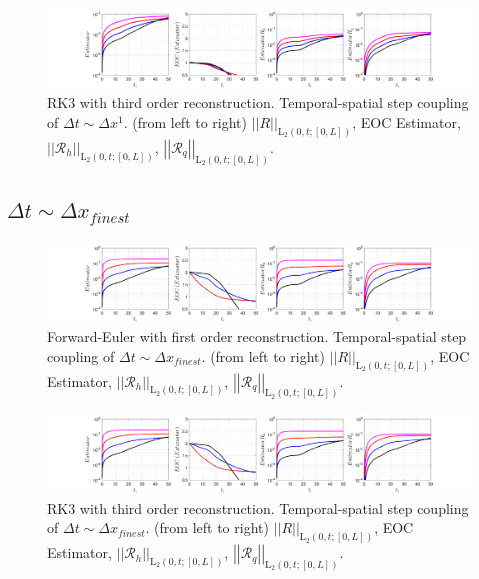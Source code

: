 \documentclass[12pt,a4paper]{article}
\numberwithin{equation}{section}
\theoremstyle{definition}
\newcommand{\leb}{\text{L}}
\newcommand{\qp}[1]{\left(#1\right)}
\newcommand{\qb}[1]{\left[#1\right]}
\newcommand{\Normgs}[1]{\left|\left|#1\right|\right|}
\begin{document}
\begin{figure}[H]
	\hspace{-3cm}
	\includegraphics[scale=0.55]{../figures/fig_SHW_RK3_LXF_rec3_pow_oneplots_1x5_shw_periodic}	
	\caption{RK3 with third order reconstruction.  Temporal-spatial step coupling of $\Delta t\sim \Delta x^1$. (from left to right) $\Normgs{R}_{\leb_2\qp{0,t; \qb{0,L}}}$, EOC Estimator, $\Normgs{\mathcal{R}_h}_{\leb_2\qp{0,t; \qb{0,L}}}$, $\Normgs{\mathcal{R}_q}_{\leb_2\qp{0,t; \qb{0,L}}}$.}
	\label{fig_all_RK3_LXF_rec3_pow_one}
\end{figure}



\subsection*{$\Delta t \sim \Delta x_{finest}$}
\begin{figure}[H]
	\hspace{-3cm}
	\includegraphics[scale=0.55]{../figures/fig_SHW_RK1_LXF_rec1_fixedplots_1x5_shw_periodic}	
	\caption{Forward-Euler with first order reconstruction.  Temporal-spatial step coupling of $\Delta t\sim \Delta x_{finest}$. (from left to right) $\Normgs{R}_{\leb_2\qp{0,t; \qb{0,L}}}$, EOC Estimator, $\Normgs{\mathcal{R}_h}_{\leb_2\qp{0,t; \qb{0,L}}}$, $\Normgs{\mathcal{R}_q}_{\leb_2\qp{0,t; \qb{0,L}}}$.}
	\label{fig_all_RK1_LXF_rec1_fixed}
\end{figure}

\begin{figure}[H]
	\hspace{-3cm}
	\includegraphics[scale=0.55]{../figures/fig_SHW_RK3_LXF_rec3_fixedplots_1x5_shw_periodic}	
	\caption{RK3 with third order reconstruction.  Temporal-spatial step coupling of $\Delta t\sim \Delta x_{finest}$. (from left to right) $\Normgs{R}_{\leb_2\qp{0,t; \qb{0,L}}}$, EOC Estimator, $\Normgs{\mathcal{R}_h}_{\leb_2\qp{0,t; \qb{0,L}}}$, $\Normgs{\mathcal{R}_q}_{\leb_2\qp{0,t; \qb{0,L}}}$.}
	\label{fig_all_RK3_LXF_rec3_fixed}
\end{figure}
\end{document}
